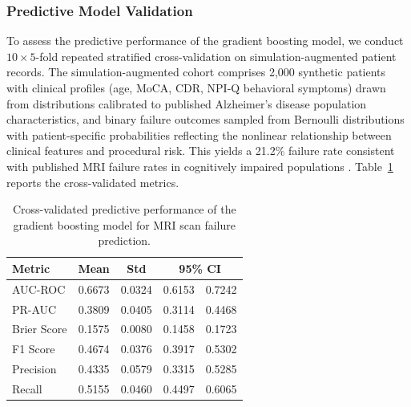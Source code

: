 \documentclass[11pt,a4paper]{article}
\begin{document}
\subsubsection{Predictive Model Validation}

To assess the predictive performance of the gradient boosting model, we conduct $10 \times 5$-fold repeated stratified cross-validation on simulation-augmented patient records. The simulation-augmented cohort comprises 2,000 synthetic patients with clinical profiles (age, MoCA, CDR, NPI-Q behavioral symptoms) drawn from distributions calibrated to published Alzheimer's disease population characteristics, and binary failure outcomes sampled from Bernoulli distributions with patient-specific probabilities reflecting the nonlinear relationship between clinical features and procedural risk. This yields a 21.2\% failure rate consistent with published MRI failure rates in cognitively impaired populations \citep{porembka2025disparities}. Table~\ref{tab:ml_cv_metrics} reports the cross-validated metrics.


\begin{table}[H]
\centering
\caption{Cross-validated predictive performance of the gradient boosting model for MRI scan failure prediction.}
\label{tab:ml_cv_metrics}
\begin{tabular}{lcccc}
\toprule
Metric & Mean & Std & \multicolumn{2}{c}{95\% CI} \\
\midrule
AUC-ROC & 0.6673 & 0.0324 & 0.6153 & 0.7242 \\
PR-AUC & 0.3809 & 0.0405 & 0.3114 & 0.4468 \\
Brier Score & 0.1575 & 0.0080 & 0.1458 & 0.1723 \\
F1 Score & 0.4674 & 0.0376 & 0.3917 & 0.5302 \\
Precision & 0.4335 & 0.0579 & 0.3315 & 0.5285 \\
Recall & 0.5155 & 0.0460 & 0.4497 & 0.6065 \\
\bottomrule
\end{tabular}
\end{table}
\end{document}
